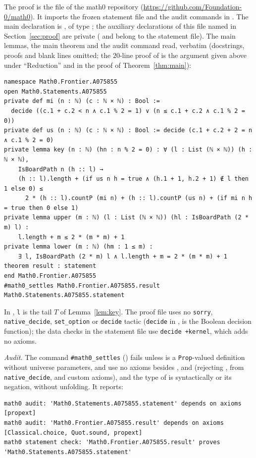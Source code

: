 \documentclass[11pt]{amsart}
\theoremstyle{plain}
\theoremstyle{definition}
\begin{document}
The proof is the file  of the math0 repository (\url{https://github.com/Foundation-0/math0}). It imports the frozen statement file and the audit commands in . The main declaration is , of type ; the auxiliary declarations of this file named in Section~\ref{sec:proof} are private ( and  belong to the statement file). The main lemmas, the main theorem and the audit command read, verbatim (docstrings, proofs and blank lines omitted; the $20$-line proof of  is the argument given above under ``Reduction'' and in the proof of Theorem~\ref{thm:main}):
\begin{lstlisting}
namespace Math0.Frontier.A075855
open Math0.Statements.A075855
private def mi (n : ℕ) (c : ℕ × ℕ) : Bool :=
  decide ((c.1 + c.2 < n ∧ c.1 % 2 = 1) ∨ (n ≤ c.1 + c.2 ∧ c.1 % 2 = 0))
private def us (n : ℕ) (c : ℕ × ℕ) : Bool := decide (c.1 + c.2 + 2 = n ∧ c.1 % 2 = 0)
private lemma key (n : ℕ) (hn : n % 2 = 0) : ∀ (l : List (ℕ × ℕ)) (h : ℕ × ℕ),
    IsBoardPath n (h :: l) →
    (h :: l).length + (if us n h = true ∧ (h.1 + 1, h.2 + 1) ∉ l then 1 else 0) ≤
      2 * (h :: l).countP (mi n) + (h :: l).countP (us n) + (if mi n h = true then 0 else 1)
private lemma upper (m : ℕ) (l : List (ℕ × ℕ)) (hl : IsBoardPath (2 * m) l) :
    l.length + m ≤ 2 * (m * m) + 1
private lemma lower (m : ℕ) (hm : 1 ≤ m) :
    ∃ l, IsBoardPath (2 * m) l ∧ l.length + m = 2 * (m * m) + 1
theorem result : statement
end Math0.Frontier.A075855
#math0_settles Math0.Frontier.A075855.result Math0.Statements.A075855.statement
\end{lstlisting}
In , \texttt{l} is the tail $T$ of Lemma~\ref{lem:key}. The proof file uses no \texttt{sorry}, \texttt{native\_decide}, \texttt{set\_option} or \texttt{decide} tactic (\texttt{decide} in ,  is the Boolean decision function); the data checks in the statement file use \texttt{decide +kernel}, which adds no axioms.

\emph{Audit.} The command \texttt{\#math0\_settles} () fails unless  is a \texttt{Prop}-valued definition without universe parameters,  and  use no axioms besides ,  and  (rejecting ,  from \texttt{native\_decide}, and custom axioms), and the type of  is syntactically  or its negation, without unfolding. It reports:
\begin{lstlisting}[basicstyle=\ttfamily\tiny]
math0 audit: 'Math0.Statements.A075855.statement' depends on axioms [propext]
math0 audit: 'Math0.Frontier.A075855.result' depends on axioms [Classical.choice, Quot.sound, propext]
math0 statement check: 'Math0.Frontier.A075855.result' proves 'Math0.Statements.A075855.statement'
\end{lstlisting}
\end{document}
